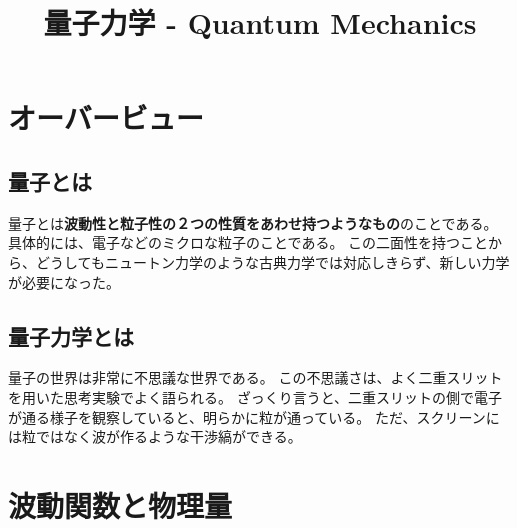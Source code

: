 \documentclass[a4paper]{jsreport}
\title{量子力学 - Quantum Mechanics}
\begin{document}
    \maketitle

    \tableofcontents

    \chapter{オーバービュー}

        \section{量子とは}
            量子とは\textbf{波動性と粒子性の２つの性質をあわせ持つようなもの}のことである。
            具体的には、電子などのミクロな粒子のことである。
            この二面性を持つことから、どうしてもニュートン力学のような古典力学では対応しきらず、新しい力学が必要になった。

        \section{量子力学とは}
            量子の世界は非常に不思議な世界である。
            この不思議さは、よく二重スリットを用いた思考実験でよく語られる。
            ざっくり言うと、二重スリットの側で電子が通る様子を観察していると、明らかに粒が通っている。
            ただ、スクリーンには粒ではなく波が作るような干渉縞ができる。

            


    \chapter{波動関数と物理量}
\end{document}
